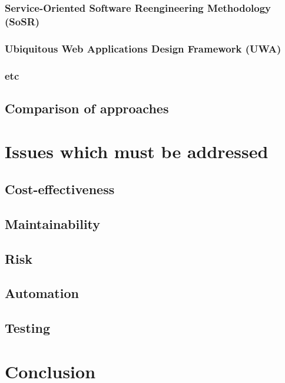 \documentclass[a4paper,10pt]{article}
\begin{document}
\subsubsection{Service-Oriented Software Reengineering Methodology (SoSR)}

\subsubsection{Ubiquitous Web Applications Design Framework (UWA)}

\subsubsection{etc}

\subsection{Comparison of approaches}

\section{Issues which must be addressed}

\subsection{Cost-effectiveness}

\subsection{Maintainability}

\subsection{Risk}

\subsection{Automation}

\subsection{Testing}

\section{Conclusion}
\end{document}
